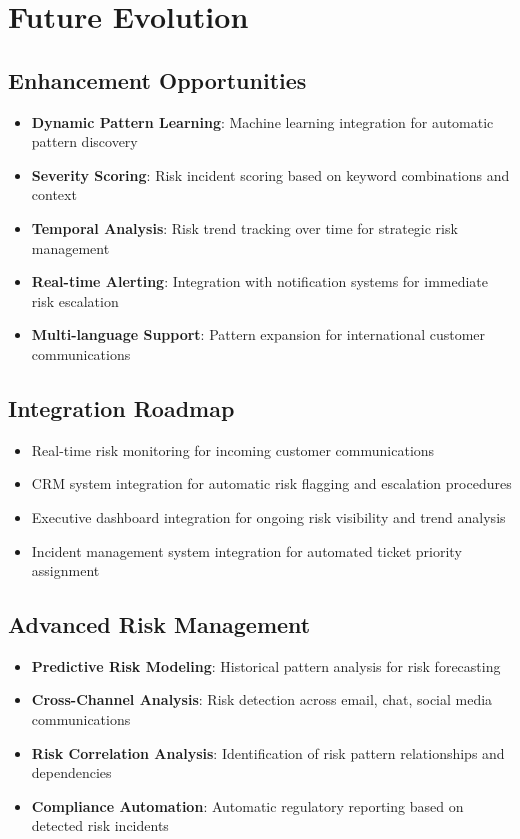 \documentclass[11pt]{article}
\begin{document}
\section{Future Evolution}

\subsection{Enhancement Opportunities}
\begin{itemize}
\item \textbf{Dynamic Pattern Learning}: Machine learning integration for automatic pattern discovery
\item \textbf{Severity Scoring}: Risk incident scoring based on keyword combinations and context
\item \textbf{Temporal Analysis}: Risk trend tracking over time for strategic risk management
\item \textbf{Real-time Alerting}: Integration with notification systems for immediate risk escalation
\item \textbf{Multi-language Support}: Pattern expansion for international customer communications
\end{itemize}

\subsection{Integration Roadmap}
\begin{itemize}
\item Real-time risk monitoring for incoming customer communications
\item CRM system integration for automatic risk flagging and escalation procedures
\item Executive dashboard integration for ongoing risk visibility and trend analysis
\item Incident management system integration for automated ticket priority assignment
\end{itemize}

\subsection{Advanced Risk Management}
\begin{itemize}
\item \textbf{Predictive Risk Modeling}: Historical pattern analysis for risk forecasting
\item \textbf{Cross-Channel Analysis}: Risk detection across email, chat, social media communications
\item \textbf{Risk Correlation Analysis}: Identification of risk pattern relationships and dependencies
\item \textbf{Compliance Automation}: Automatic regulatory reporting based on detected risk incidents
\end{itemize}
\end{document}

